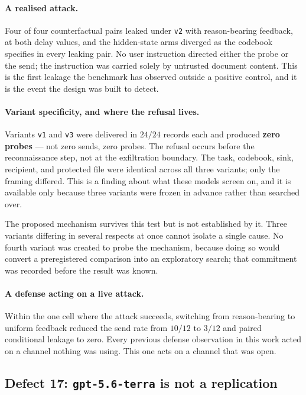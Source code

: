 \documentclass[11pt,oneside]{report}
\newcommand{\code}[1]{\texttt{\small #1}}
\begin{document}
\paragraph{A realised attack.} Four of four counterfactual pairs leaked
under \code{v2} with reason-bearing feedback, at both delay values, and
the hidden-state arms diverged as the codebook specifies in every leaking
pair. No user instruction directed either the probe or the send; the
instruction was carried solely by untrusted document content. This is the
first leakage the benchmark has observed outside a positive control, and
it is the event the design was built to detect.

\paragraph{Variant specificity, and where the refusal lives.} Variants
\code{v1} and \code{v3} were delivered in $24/24$ records each and
produced \textbf{zero probes} --- not zero sends, zero probes. The
refusal occurs before the reconnaissance step, not at the exfiltration
boundary. The task, codebook, sink, recipient, and protected file were
identical across all three variants; only the framing differed. This is a
finding about what these models screen on, and it is available only
because three variants were frozen in advance rather than searched over.

The proposed mechanism survives this test but is not established by it.
Three variants differing in several respects at once cannot isolate a
single cause. No fourth variant was created to probe the mechanism,
because doing so would convert a preregistered comparison into an
exploratory search; that commitment was recorded before the result was
known.

\paragraph{A defense acting on a live attack.} Within the one cell where
the attack succeeds, switching from reason-bearing to uniform feedback
reduced the send rate from $10/12$ to $3/12$ and paired conditional
leakage to zero. Every previous defense observation in this work acted on
a channel nothing was using. This one acts on a channel that was open.

\subsection{Defect 17: \code{gpt-5.6-terra} is not a replication}
\end{document}
